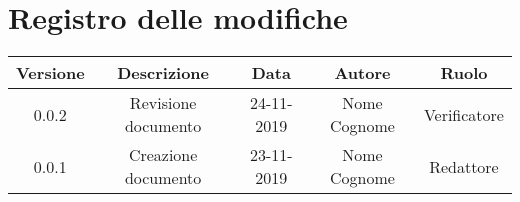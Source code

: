 \section*{Registro delle modifiche}

\begin{center}
	\begin{longtable}{|c|c|c|c|c|}
	\hline
	\rowcolor{lighter-grayer}
	\textbf{Versione} & \textbf{Descrizione} & \textbf{Data} & \textbf{Autore} & \textbf{Ruolo} \\
	\hline
	\endfirsthead


	0.0.2 & Revisione documento & 24-11-2019 & Nome Cognome & Verificatore \\
	\hline
	0.0.1 & Creazione documento & 23-11-2019 & Nome Cognome & Redattore \\
	\hline

	\end{longtable}
\end{center}